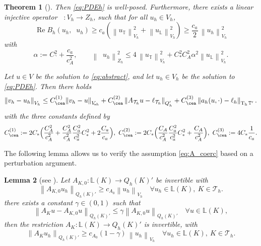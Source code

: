 \documentclass[11pt]{article}
\newenvironment{eqs} %
 { \begin{equation} \begin{aligned} } %
 { \end{aligned} \end{equation} \ignorespacesafterend } %
\theoremstyle{definition}
\theoremstyle{plain}
\newtheorem{theorem}{Theorem}[section]
\newtheorem{lemma}[theorem]{Lemma}
\newcommand{\CA}{C_A}
\newcommand{\Ca}{C_a}
\newcommand{\ca}{c_a}
\newcommand{\cA}{c_A}
\newcommand{\CD}{C_*}
\newcommand{\CT}{C_\urcorner}
\newcommand{\cAP}{c_{A_0}}
\newcommand{\Vsh}{V_{\!\star \hspace*{-0.2mm}h}}
\newcommand{\dgnorm}[1]{\norm{#1}_{V_h}}
\newcommand{\tdgnorm}[1]{{\Vert#1\Vert}_{\Vsh}}
\newcommand{\Th}{{\calT_h}}
\newcommand{\AK}{{A_K}}
\newcommand{\ILh}{\mathbb{L}}
\newcommand{\LKh}{\mathbb{L}(K)}
\newcommand{\QKh}{Q_h(K)}
\newcommand{\Qh}{Q_h}
\newcommand{\ATh}{A_{\Th}}
\newcommand{\Bh}{{B_h}}
\renewcommand{\Re}{\operatorname{Re}}
\DeclareMathOperator{\tcb}{T_{B}}
\DeclareMathOperator{\tch}{T_h}
\newcommand*{\norm}[1]{\left\|#1\right\|}
\newcommand{\IL}{\mathbb{L}}
\newcommand{\IT}{\mathbb{T}}
\newcommand{\ITh}{\mathbb{T}}
\newcommand{\calT}{\mathcal{T}}
\begin{document}
\begin{theorem}[{\cite[\S 2.5]{LLSV_ARXIV_2024}}]
Then \eqref{eq:PDEh} is well-posed.
Furthermore, there exists a linear injective operator $\tcb:V_h\to Z_h$, such that for all $u_h\in V_h$,
\begin{equation}
  \Re \Bh(u_h,\tcb u_h) \ge \ca(\dgnorm{u_\IT}^2 + \dgnorm{u_\IL}^2) \ge \frac{\ca}{2}\,\dgnorm{u_h}^2
\end{equation}
with
\[
\alpha:=\CT^2+\frac{\ca}{\cA^2},
\qquad
\norm{\tcb u_h}_{Z_h}^2 \leq 4\,\dgnorm{u_\IT}^2 + \CD^2\CA^2\alpha^2 \dgnorm{u_\IL}^2.
\]

Let $u\in V$ be the solution to \eqref{eq:abstract}, and let $u_h\in V_h$ be the solution to \eqref{eq:PDEh}. Then there holds
\begin{eqs}\label{eq:cea}
\dgnorm{v_h-u_h} \leq C_{\cea}^{(1)} \tdgnorm{v_h - u} + C_{\cea}^{(2)}\norm{\ATh u - \ell_\Th}_{\Qh'} + C_{\cea}^{(3)}\norm{a_h(u,\cdot)-\ell_h}_{\tch\ITh'}.\\
\end{eqs}
with the three constants defined by
\begin{equation*}
C_{\cea}^{(1)}:=2\CD\Big( \frac{\CA^2}{\cA^2} +\frac{\CA^2}{\cA^2}\frac{\Ca^2}{\ca^2}\CD^2 +2\frac{\Ca}{\ca} \Big),\
C_{\cea}^{(2)}:=2\CD\Big( \frac{\CA}{\cA^2}\frac{\Ca^2}{\ca^2}\CD^2 +\frac{\CA}{\cA^2} \Big),\
C_{\cea}^{(3)}:=4\CD\frac{1}{\ca}.
\end{equation*}
\end{theorem}

The following lemma allows us to verify the assumption \eqref{eq:A_coerc} based on a perturbation argument.
\begin{lemma}[see {\cite[Lemma 3.4]{LLSV_ARXIV_2024}}]
    \label{lem:abstractneumann}
    Let $A_{K,0}:\LKh \to \QKh'$ be invertible with 
    \begin{equation}\label{eq:A0_coerc}
        \norm{A_{K,0}  u_h }_{\QKh'} \geq \cAP \norm{u_h}_{V_h}
        \quad \forall u_h \in \ILh(K),\ K\in\Th.
    \end{equation}
    there exists a constant $\gamma \in (0,1)$ such that
    \begin{equation}\label{eq:nearlycontant}
        \norm{\AK  u - A_{K,0}u}_{\QKh'}\le\gamma\norm{A_{K,0}u}_{\QKh'} \quad \forall u\in \LKh,
    \end{equation}
    then the restriction $\AK : \LKh \to \QKh'$ is invertible, with
    \begin{equation}\label{eq:A_A0_coerc}
        \norm{A_{K}  u_h }_{\QKh'} \geq \cAP(1-\gamma)\, \norm{u_h}_{V_h}
        \quad \forall u_h \in \ILh(K),\ K\in\Th.
    \end{equation}
\end{lemma}
\end{document}
